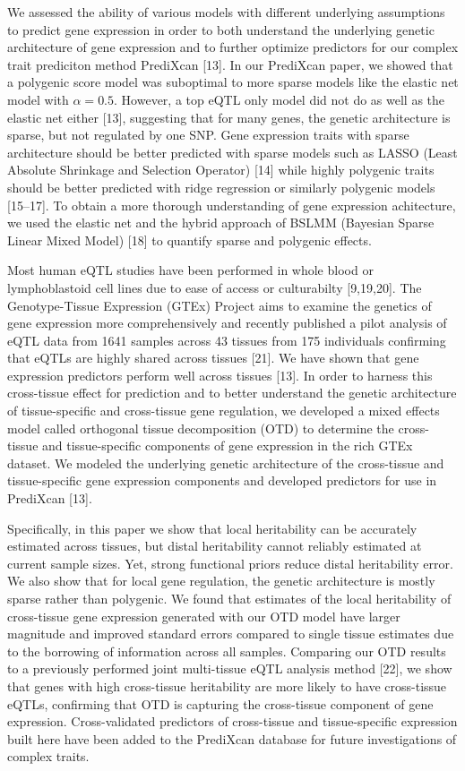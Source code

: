 \documentclass[]{article}
\begin{document}
We assessed the ability of various models with different underlying
assumptions to predict gene expression in order to both understand the
underlying genetic architecture of gene expression and to further
optimize predictors for our complex trait prediciton method PrediXcan
{[}13{]}. In our PrediXcan paper, we showed that a polygenic score model
was suboptimal to more sparse models like the elastic net model with
\(\alpha=0.5\). However, a top eQTL only model did not do as well as the
elastic net either {[}13{]}, suggesting that for many genes, the genetic
architecture is sparse, but not regulated by one SNP. Gene expression
traits with sparse architecture should be better predicted with sparse
models such as LASSO (Least Absolute Shrinkage and Selection Operator)
{[}14{]} while highly polygenic traits should be better predicted with
ridge regression or similarly polygenic models {[}15--17{]}. To obtain a
more thorough understanding of gene expression achitecture, we used the
elastic net and the hybrid approach of BSLMM (Bayesian Sparse Linear
Mixed Model) {[}18{]} to quantify sparse and polygenic effects.

Most human eQTL studies have been performed in whole blood or
lymphoblastoid cell lines due to ease of access or culturabilty
{[}9,19,20{]}. The Genotype-Tissue Expression (GTEx) Project aims to
examine the genetics of gene expression more comprehensively and
recently published a pilot analysis of eQTL data from 1641 samples
across 43 tissues from 175 individuals confirming that eQTLs are highly
shared across tissues {[}21{]}. We have shown that gene expression
predictors perform well across tissues {[}13{]}. In order to harness
this cross-tissue effect for prediction and to better understand the
genetic architecture of tissue-specific and cross-tissue gene
regulation, we developed a mixed effects model called orthogonal tissue
decomposition (OTD) to determine the cross-tissue and tissue-specific
components of gene expression in the rich GTEx dataset. We modeled the
underlying genetic architecture of the cross-tissue and tissue-specific
gene expression components and developed predictors for use in PrediXcan
{[}13{]}.

Specifically, in this paper we show that local heritability can be
accurately estimated across tissues, but distal heritability cannot
reliably estimated at current sample sizes. Yet, strong functional
priors reduce distal heritability error. We also show that for local
gene regulation, the genetic architecture is mostly sparse rather than
polygenic. We found that estimates of the local heritability of
cross-tissue gene expression generated with our OTD model have larger
magnitude and improved standard errors compared to single tissue
estimates due to the borrowing of information across all samples.
Comparing our OTD results to a previously performed joint multi-tissue
eQTL analysis method {[}22{]}, we show that genes with high cross-tissue
heritability are more likely to have cross-tissue eQTLs, confirming that
OTD is capturing the cross-tissue component of gene expression.
Cross-validated predictors of cross-tissue and tissue-specific
expression built here have been added to the PrediXcan database for
future investigations of complex traits.
\end{document}

